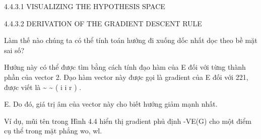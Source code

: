 4.4.3.1 VISUALIZING THE HYPOTHESIS SPACE

4.4.3.2 DERIVATION OF THE GRADIENT DESCENT RULE

Làm thế nào chúng ta có thể tính toán hướng đi xuống dốc nhất dọc theo bề mặt sai số?

Hướng này có thể được tìm bằng cách tính đạo hàm của E đối với từng thành phần của vector 2. Đạo hàm vector này được gọi là gradient của E đối với 221, được viết là \textasciitilde{} \textasciitilde{} ( i i r ) .

E. Do đó, giá trị âm của vector này cho biết hướng giảm mạnh nhất.

Ví dụ, mũi tên trong Hình 4.4 hiển thị gradient phủ định -VE(G) cho một điểm cụ thể trong mặt phẳng wo, wl.

